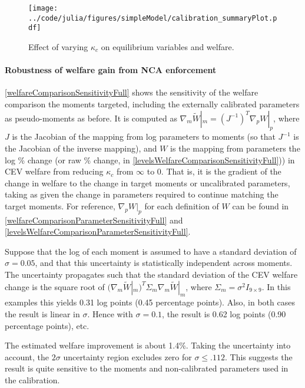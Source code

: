 \documentclass[11pt,english]{article}
\theoremstyle{remark}
\begin{document}
\begin{figure}[]
	\texttt{[image: ../code/julia/figures/simpleModel/calibration\_summaryPlot.pdf]}
	\caption{Effect of varying $\kappa_c$ on equilibrium variables and welfare.}
	\label{calibration_summaryPlot}
\end{figure}




\paragraph{Robustness of welfare gain from NCA enforcement}

\autoref{welfareComparisonSensitivityFull} shows the sensitivity of the welfare comparison the moments targeted, including the externally calibrated parameters as pseudo-moments as before. It is computed as $\nabla_m \tilde{W}|_m = (J^{-1})^T \nabla_p W|_p$, where $J$ is the Jacobian of the mapping from log parameters to moments (so that $J^{-1}$ is the Jacobian of the inverse mapping), and $W$ is the mapping from parameters the log \% change (or raw \% change, in \autoref{levelsWelfareComparisonSensitivityFull})) in CEV welfare from reducing $\kappa_c$ from $\infty$ to $0$. That is, it is the gradient of the change in welfare to the change in target moments or uncalibrated parameters, taking as given the change in parameters required to continue matching the target moments. For reference, $\nabla_p W|_p$  for each definition of $W$ can be found in \autoref{welfareComparisonParameterSensitivityFull} and \autoref{levelsWelfareComparisonParameterSensitivityFull}.

Suppose that the log of each moment is assumed to have a standard deviation of $\sigma = 0.05$, and that this uncertainty is statistically independent across moments. The uncertainty propagates such that the standard deviation of the CEV welfare change is the square root of $(\nabla_m \tilde{W}|_m)^T \Sigma_m \nabla_m \tilde{W}|_m$, where $\Sigma_m = \sigma^2 I_{9\times 9}$. In this examples this yields 0.31 log points (0.45 percentage points). Also, in both cases the result is linear in $\sigma$. Hence with $\sigma = 0.1$, the result is 0.62 log points (0.90 percentage points), etc. 

The estimated welfare improvement is about 1.4\%. Taking the uncertainty into account, the $2\sigma$ uncertainty region excludes zero for $\sigma \le .112$. This suggests the result is quite sensitive to the moments and non-calibrated parameters used in the calibration. 
\end{document}
